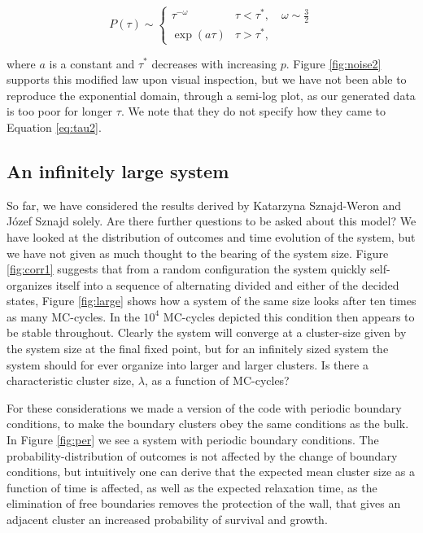 \documentclass[a4paper]{article}
\begin{document}
\begin{equation}
\label{eq:tau2}
  P(\tau) \sim
  \begin{cases}
    \tau^{-\omega} & \tau < \tau^{*},\quad \omega \sim \frac{3}{2}\\
    \exp({a\tau}) & \tau > \tau^{*},
  \end{cases}
\end{equation}

where $a$ is a constant and $\tau^*$ decreases with increasing $p$. Figure \ref{fig:noise2} supports this modified law upon visual inspection, but we have not been able to reproduce the exponential domain, through a semi-log plot, as our generated data is too poor for longer $\tau$. We note that they do not specify how they came to Equation \ref{eq:tau2}.


\subsection{An infinitely large system}

So far, we have considered the results derived by Katarzyna Sznajd-Weron and Józef Sznajd \cite{opinion} solely. Are there further questions  to be asked about this model? We have looked at the distribution of outcomes and time evolution of the system, but we have not given as much thought to the bearing of the system size. Figure \ref{fig:corr1} suggests that from a random configuration the system quickly self-organizes itself into a sequence of alternating divided and either of the decided states, Figure \ref{fig:large} shows how a system of the same size looks after ten times as many MC-cycles. In the $10^4$ MC-cycles depicted this condition then appears to be stable throughout. Clearly the system will converge at a cluster-size given by the system size at the final fixed point, but for an infinitely sized system the system should for ever organize into larger and larger clusters. Is there a characteristic cluster size, $\lambda$, as a function of MC-cycles? 

For these considerations we made a version of the code with periodic boundary conditions, to make the boundary clusters obey the same conditions as the bulk. In Figure \ref{fig:per} we see a system with periodic boundary conditions. The probability-distribution of outcomes is not affected by the change of boundary conditions, but intuitively one can derive that the expected mean cluster size as a function of time is affected, as well as the expected relaxation time, as the elimination of free boundaries removes the protection of the wall, that gives an adjacent cluster an increased probability of survival and growth.
\end{document}
